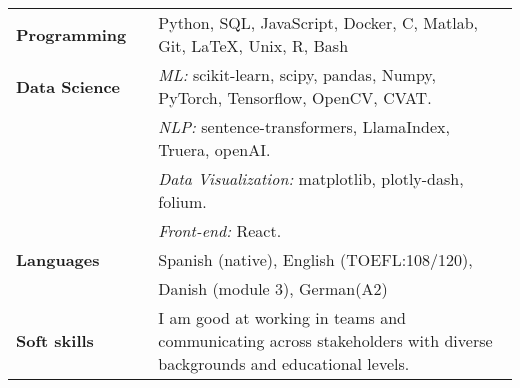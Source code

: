 \documentclass[a4paper, 12pt]{article}
\begin{document}
\begin{tabular}{p{7em} p{1em} p{32.5em}}
\textbf{Programming} & &  Python, SQL, JavaScript, Docker, C, Matlab, Git, \LaTeX, Unix, R,  Bash \\
\textbf{Data Science} & & \textit{ML:} scikit-learn, scipy, pandas, Numpy, PyTorch, Tensorflow, OpenCV, CVAT. \\
& & \textit{NLP:} sentence-transformers, LlamaIndex, Truera, openAI. \\
& & \textit{Data Visualization:} matplotlib, plotly-dash, folium. \\
& & \textit{Front-end:} React. \\
\textbf{Languages} & & Spanish (native), English (TOEFL:108/120), \\
& & Danish (module 3), German(A2) \\
\textbf{Soft skills} & & I am good at working in teams and communicating across stakeholders with diverse backgrounds and educational levels.  \\
\end{tabular}
\end{document}
